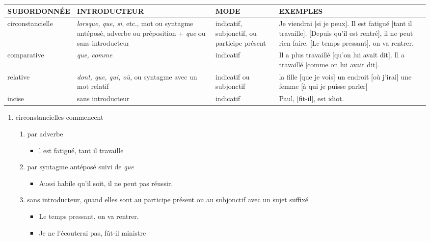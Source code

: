 \documentclass[UTF8]{report}
\begin{document}
\begin{table}[H]
    \centering

\begin{adjustbox}{max width =\textwidth}
    \begin{tabular}{|>{\RaggedRight}p{3cm}|>{\RaggedRight}p{5.5cm}|>{\RaggedRight}p{3.5cm}|>{\RaggedRight}p{5cm}|}
    \hline
    \rowcolor{cyan!20}
    \textbf{SUBORDONNÉE} & \textbf{INTRODUCTEUR} & \textbf{MODE} & \textbf{EXEMPLES} \\
    \hline
    circonstancielle & \textit{lorsque, que, si}, etc., mot ou syntagme antéposé, adverbe ou préposition + \textit{que} ou sans introducteur & indicatif, subjonctif, ou participe présent & Je viendrai [si je peux]. Il est fatigué [tant il travaille]. [Depuis qu'il est rentré], il ne peut rien faire. [Le temps pressant], on va rentrer. \\
    \hline
    comparative & \textit{que, comme} & indicatif & Il a plus travaillé [qu'on lui avait dit]. Il a travaillé [comme on lui avait dit]. \\
    \hline
    relative & \textit{dont, que, qui, où}, ou syntagme avec un mot relatif & indicatif ou subjonctif & la fille [que je vois]   un endroit [où j'irai]   une femme [à qui je puisse parler] \\
    \hline
    incise & sans introducteur & indicatif & Paul, [fit-il], est idiot. \\
    \hline
    \end{tabular}
\end{adjustbox}

\end{table}

\begin{enumerate}
    \item circonstancielles commencent
    \begin{enumerate}
        \item par adverbe
        \begin{itemize}
            \item l est fatigué, tant il travaille
        \end{itemize}
        \item par syntagme antéposé suivi de \textit{que}
        \begin{itemize}
            \item Aussi habile qu’il soit, il ne peut pas réussir.
        \end{itemize}
        \item sans introducteur, quand elles sont au participe présent ou au subjonctif avec un sujet suffixé
        \begin{itemize}
            \item Le temps pressant, on va rentrer.
            \item Je ne l’écouterai pas, fût-il ministre
        \end{itemize}
    \end{enumerate}
\end{enumerate}
\end{document}
